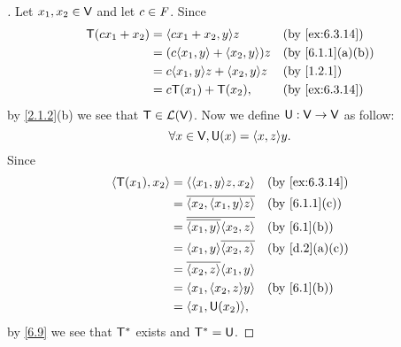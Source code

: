 \begin{proof}[]
  Let \(x_1, x_2 \in \mathsf{V}\) and let \(c \in \mathit{F}\).
  Since
  \begin{align*}
    \T(c x_1 + x_2) & = \inn{c x_1 + x_2, y} z            &  & \text{(by \cref{ex:6.3.14})}   \\
                    & = (c \inn{x_1, y} + \inn{x_2, y}) z &  & \text{(by \cref{6.1.1}(a)(b))} \\
                    & = c \inn{x_1, y} z + \inn{x_2, y} z &  & \text{(by \cref{1.2.1})}       \\
                    & = c \T(x_1) + \T(x_2),              &  & \text{(by \cref{ex:6.3.14})}
  \end{align*}
  by \cref{2.1.2}(b) we see that \(\mathsf{T} \in \mathcal{L}(\mathsf{V})\).
  Now we define \(\mathsf{U} : \mathsf{V} \to \mathsf{V}\) as follow:
  \[
    \forall x \in \V, \U(x) = \inn{x, z} y.
  \]
  Since
  \begin{align*}
    \inn{\T(x_1), x_2} & = \inn{\inn{x_1, y} z, x_2}               &  & \text{(by \cref{ex:6.3.14})} \\
                       & = \conj{\inn{x_2, \inn{x_1, y} z}}        &  & \text{(by \cref{6.1.1}(c))}  \\
                       & = \conj{\conj{\inn{x_1, y}} \inn{x_2, z}} &  & \text{(by \cref{6.1}(b))}    \\
                       & = \inn{x_1, y} \conj{\inn{x_2, z}}        &  & \text{(by \cref{d.2}(a)(c))} \\
                       & = \conj{\inn{x_2, z}} \inn{x_1, y}                                          \\
                       & = \inn{x_1, \inn{x_2, z} y}               &  & \text{(by \cref{6.1}(b))}    \\
                       & = \inn{x_1, \U(x_2)},
  \end{align*}
  by \cref{6.9} we see that \(\mathsf{T}^*\) exists and \(\mathsf{T}^* = \mathsf{U}\).
\end{proof}

\begin{ex}\label{ex:6.3.19}

\end{ex}

\begin{ex}\label{ex:6.3.24}

\end{ex}
